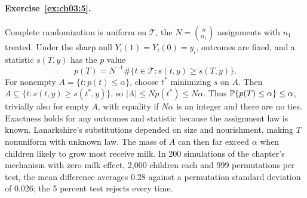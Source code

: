 \paragraph{Exercise~\ref{ex:ch03:5}.} Complete randomization is uniform on $\mathcal T$, the $N=\binom n{n_1}$ assignments with $n_1$ treated. Under the sharp null $Y_i(1)=Y_i(0)=y_i$, outcomes are fixed, and a statistic $s(T,y)$ has the $p$ value
\[
p(T)=N^{-1}\#\{t\in\mathcal T:s(t,y)\ge s(T,y)\}.
\]
For nonempty $A=\{t:p(t)\le\alpha\}$, choose $t^*$ minimizing $s$ on $A$. Then $A\subseteq\{t:s(t,y)\ge s(t^*,y)\}$, so $|A|\le Np(t^*)\le N\alpha$. Thus $\mathbb{P}\{p(T)\le\alpha\}\le\alpha$, trivially also for empty $A$, with equality if $N\alpha$ is an integer and there are no ties. Exactness holds for any outcomes and statistic because the assignment law is known. Lanarkshire's substitutions depended on size and nourishment, making $T$ nonuniform with unknown law. The mass of $A$ can then far exceed $\alpha$ when children likely to grow most receive milk. In 200 simulations of the chapter's mechanism with zero milk effect, 2,000 children each and 999 permutations per test, the mean difference averages 0.28 against a permutation standard deviation of 0.026; the 5 percent test rejects every time.

